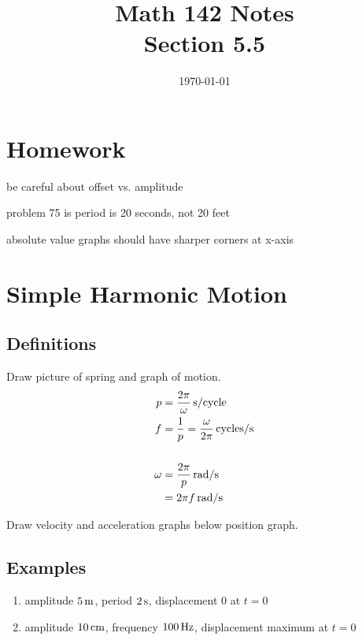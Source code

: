 \documentclass{exam}
\title{Math 142 Notes \\ Section 5.5}
\date{\today}
\begin{document}
  \maketitle
  \tableofcontents

  \pagebreak

  \section{Homework}
  \begin{itemize*}
    \item be careful about offset vs. amplitude
    \item problem 75 is period is 20 seconds, not 20 feet
    \item absolute value graphs should have sharper corners at x-axis
  \end{itemize*}

  \section{Simple Harmonic Motion}

  \subsection{Definitions}
    Draw picture of spring and graph of motion.
    \begin{align*}
      p      & = \unit[ \frac{2 \pi}{\omega} ]{s/cycle} \\
      f      & = \frac{1}{p} = \unit[ \frac{\omega}{2 \pi} ]{cycles/s} \\
      \\
      \omega & = \unit[ \frac{2 \pi}{p} ]{rad/s} \\
             & = \unit[ 2 \pi f ]{rad/s} \\
    \end{align*}

    Draw velocity and acceleration graphs below position graph.

  \subsection{Examples}
  \begin{enumerate}
    \item amplitude $\unit[5]{m}$, period $\unit[2]{s}$, displacement 0 at $t = 0$
    \item amplitude $\unit[10]{cm}$, frequency $\unit[100]{Hz}$, displacement maximum at $t = 0$ 
  \end{enumerate}
\end{document}
